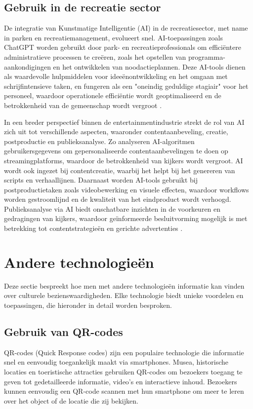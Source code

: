 \subsection{Gebruik in de recreatie sector}

De integratie van Kunstmatige Intelligentie (AI) in de recreatiesector, met name in parken en recreatiemanagement, evolueert snel. AI-toepassingen zoals ChatGPT worden gebruikt door park- en recreatieprofessionals om efficiëntere administratieve processen te creëren, zoals het opstellen van programma-aankondigingen en het ontwikkelen van noodactieplannen. Deze AI-tools dienen als waardevolle hulpmiddelen voor ideeënontwikkeling en het omgaan met schrijfintensieve taken, en fungeren als een "oneindig geduldige stagiair" voor het personeel, waardoor operationele efficiëntie wordt geoptimaliseerd en de betrokkenheid van de gemeenschap wordt vergroot \autocite{ParksRecAI2023}.

In een breder perspectief binnen de entertainmentindustrie strekt de rol van AI zich uit tot verschillende aspecten, waaronder contentaanbeveling, creatie, postproductie en publieksanalyse. Zo analyseren AI-algoritmen gebruikersgegevens om gepersonaliseerde contentaanbevelingen te doen op streamingplatforms, waardoor de betrokkenheid van kijkers wordt vergroot. AI wordt ook ingezet bij contentcreatie, waarbij het helpt bij het genereren van scripts en verhaallijnen. Daarnaast worden AI-tools gebruikt bij postproductietaken zoals videobewerking en visuele effecten, waardoor workflows worden gestroomlijnd en de kwaliteit van het eindproduct wordt verhoogd. Publieksanalyse via AI biedt onschatbare inzichten in de voorkeuren en gedragingen van kijkers, waardoor geïnformeerde besluitvorming mogelijk is met betrekking tot contentstrategieën en gerichte advertenties \autocite{WebisoftEntAI}.

\section{Andere technologieën}
Deze sectie bespreekt hoe men met andere technologieën informatie kan vinden over culturele bezienswaardigheden. Elke technologie biedt unieke voordelen en toepassingen, die hieronder in detail worden besproken.

\subsection{Gebruik van QR-codes}
QR-codes (Quick Response codes) zijn een populaire technologie die informatie snel en eenvoudig toegankelijk maakt via smartphones. Musea, historische locaties en toeristische attracties gebruiken QR-codes om bezoekers toegang te geven tot gedetailleerde informatie, video's en interactieve inhoud. Bezoekers kunnen eenvoudig een QR-code scannen met hun smartphone om meer te leren over het object of de locatie die zij bekijken.

